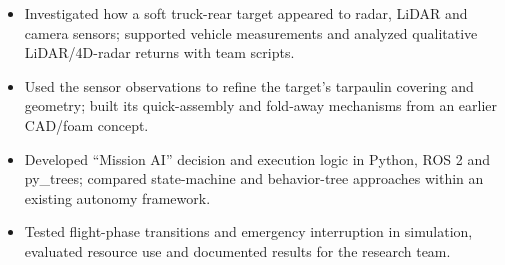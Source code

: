 
\begin{itemize}\small
\item Investigated how a soft truck-rear target appeared to radar, LiDAR and camera sensors; supported vehicle measurements and analyzed qualitative LiDAR/4D-radar returns with team scripts.
\item Used the sensor observations to refine the target's tarpaulin covering and geometry; built its quick-assembly and fold-away mechanisms from an earlier CAD/foam concept.
\end{itemize}


\begin{itemize}\small
\item Developed ``Mission AI'' decision and execution logic in Python, ROS 2 and py\_trees; compared state-machine and behavior-tree approaches within an existing autonomy framework.
\item Tested flight-phase transitions and emergency interruption in simulation, evaluated resource use and documented results for the research team.
\end{itemize}
